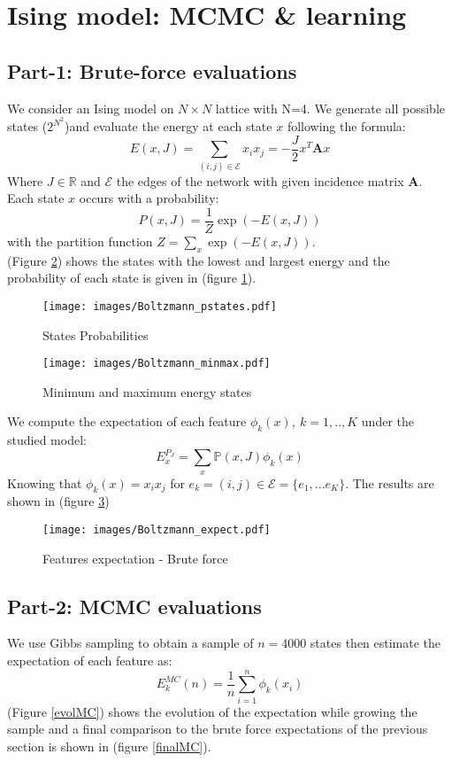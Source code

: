 \documentclass[11pt]{article}
\theoremstyle{exo}
\newcommand{\p}{\mathbb{P}}
\newcommand{\R}{\mathbb{R}}
\newcommand{\1}{\mathbbm{1}}
\begin{document}
\section{Ising model: MCMC \& learning}
	\subsection{Part-1: Brute-force evaluations}
		We consider an Ising model on $N\times N$ lattice with N=4. We generate all possible states ($2^{N^2}$)and evaluate the energy at each state $x$ following the formula:
		\[E(x,J)=\sum_{(i,j)\in\mathcal E}x_ix_j=-\frac{J}{2}x^T\mathbf Ax\] 
		Where $J\in\R$ and $\mathcal E$ the edges of the network with given incidence matrix $\mathbf A$.
		Each state $x$ occurs with a probability:
		\[P(x,J)=\dfrac{1}{Z}\exp(-E(x,J))\]
		with the partition function $Z=\sum_x\exp(-E(x,J))$.\\
		(Figure \ref{minmax}) shows the states with the lowest and largest energy and the probability of each state is given in (figure \ref{proba}).
			
		\begin{figure}[H]
			\centering
			\caption{States Probabilities\label{proba}}
			\texttt{[image: images/Boltzmann\_pstates.pdf]}
		\end{figure}
		\begin{figure}[H]
			\centering
			\caption{Minimum and maximum energy states\label{minmax}}
			\texttt{[image: images/Boltzmann\_minmax.pdf]}
		\end{figure}

		We compute the expectation of each feature $\phi_k(x),\:k=1,..,K$ under the studied model:
		\[E_x^{P_J}=\sum_x\p(x,J)\phi_k(x)\]
		Knowing that $\phi_k(x)=x_ix_j$ for $e_k=(i,j)\in\mathcal E=\{e_1,...e_K\}$. The results are shown in (figure \ref{feat})
		\begin{figure}[H]
			\centering
			\caption{Features expectation - Brute force\label{feat}}
			\texttt{[image: images/Boltzmann\_expect.pdf]}
		\end{figure}
	\subsection{Part-2: MCMC evaluations}
		We use Gibbs sampling to obtain a sample of $n=4000$ states then estimate the expectation of each feature as:
		\[E_k^{MC}(n)=\frac{1}{n}\sum_{i=1}^n\phi_k(x_i)\]
		(Figure \ref{evolMC}) shows the evolution of the expectation while growing the sample and a final comparison to the brute force expectations of the previous section is shown in (figure \ref{finalMC}).
		\begin{figure}[H]
			\centering
		\end{figure}
\end{document}
